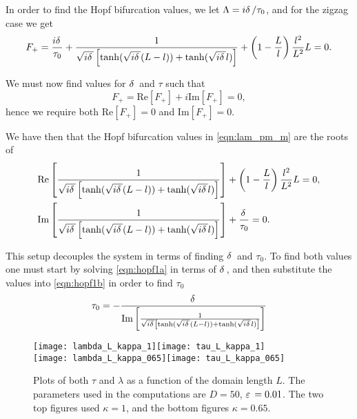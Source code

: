 In order to find the Hopf bifurcation values, we let $\Lambda = i\delta\,/\tau_0$, and for the zigzag case we get
% 
\[
\begin{split}
  F_+ = \frac{i\delta\,}{\tau_0} + \frac{1}{\sqrt{i\delta\,}\left[\tanh(\sqrt{i\delta\,}(L-l)) + \tanh(\sqrt{i\delta\,}l) \right]} + \left(1-\frac{L}{l}\right)\frac{l^2}{L^2}L = 0.
\end{split}
\]
% 

We must now find values for $\delta\,$ and $\tau$ such that
% 
\[
  F_+ = \text{Re}[F_+] + i\text{Im}[F_+] = 0,
\]
% 
hence we require both $\text{Re}[F_+]=0$ and $\text{Im}[F_+]=0$.

We have then that the Hopf bifurcation values in \eqref{eqn:lam_pm_m} are the roots of
% 
\begin{subequations}
\label{eqn:hopf1}
\begin{align}
\label{eqn:hopf1a}
  &\text{Re}\left[\frac{1}{\sqrt{i\delta\,}\left[\tanh(\sqrt{i\delta\,}(L-l)) + \tanh(\sqrt{i\delta\,}l) \right]}\right] + \left(1-\frac{L}{l}\right)\frac{l^2}{L^2}L = 0,\\
\label{eqn:hopf1b}
  &\text{Im}\left[\frac{1}{\sqrt{i\delta\,}\left[\tanh(\sqrt{i\delta\,}(L-l)) + \tanh(\sqrt{i\delta\,}l) \right]}\right] + \frac{\delta\,}{\tau_0} = 0.
\end{align}
\end{subequations}
% 

This setup decouples the system in terms of finding $\delta\,$ and $\tau_0$. To find both values one must start by solving \eqref{eqn:hopf1a} in terms of $\delta\,$, and then substitute the values into \eqref{eqn:hopf1b} in order to find $\tau_0$
% 
\[
  \tau_0 = -\frac{\delta\,}{\text{Im}\left[\frac{1}{\sqrt{i\delta\,}\left[\tanh(\sqrt{i\delta\,}(L-l)) + \tanh(\sqrt{i\delta\,}l) \right]}\right]}
\]
% 
\begin{figure}[htb]
\begin{center}
\texttt{[image: lambda\_L\_kappa\_1]}\texttt{[image: tau\_L\_kappa\_1]}\\
\texttt{[image: lambda\_L\_kappa\_065]}\texttt{[image: tau\_L\_kappa\_065]}
\caption{Plots of both $\tau$ and $\lambda$ as a function of the domain length $L$. The parameters used in the computations are $D=50$, $\varepsilon\,=0.01$. The two top figures used $\kappa=1$, and the bottom figures $\kappa=0.65$.}
\label{fig:hopf1}
\end{center}
\end{figure}
% 

